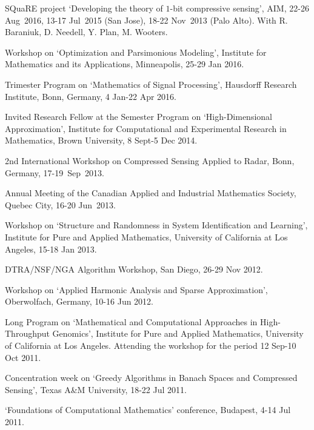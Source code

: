 \documentclass[11pt]{article}
\begin{document}
\item SQuaRE project `Developing the theory of $1$-bit compressive sensing',
AIM, 22-26 Aug~2016, 13-17 Jul~2015 (San Jose), 18-22 Nov~2013 (Palo Alto). With R. Baraniuk, D. Needell, Y. Plan, M. Wooters.
\item Workshop on `Optimization and Parsimonious Modeling', 
Institute for Mathematics and its Applications, Minneapolis, 25-29 Jan 2016.
\item Trimester Program on `Mathematics of Signal Processing', Hausdorff Research Institute, Bonn, Germany,
4 Jan-22 Apr 2016.
\item Invited Research Fellow at the Semester Program on `High-Dimensional Approximation', 
Institute for Computational and Experimental Research in Mathematics, Brown University,
8 Sept-5 Dec 2014.
\item 2nd International Workshop on Compressed Sensing Applied to Radar,
Bonn, Germany, 17-19~Sep~2013.
\item Annual Meeting of the Canadian Applied
and Industrial Mathematics Society, Quebec City, 16-20 Jun~2013. 
\item Workshop on `Structure and Randomness in System Identification and Learning',
Institute for Pure and Applied Mathematics, University of California at Los Angeles, 15-18 Jan 2013.
\item DTRA/NSF/NGA Algorithm Workshop, San Diego, 26-29 Nov 2012.
\item Workshop on `Applied Harmonic Analysis and Sparse Approximation', Oberwolfach, Germany, 10-16 Jun 2012.
\item Long Program on `Mathematical and Computational Approaches in High-Throughput Genomics', 
Institute for Pure and Applied Mathematics, University of California at Los Angeles.
Attending the workshop for the period 12 Sep-10 Oct 2011.
\item Concentration week on `Greedy Algorithms in Banach Spaces and Compressed Sensing', Texas A\&M University, 18-22 Jul 2011.
\item `Foundations of Computational Mathematics' conference, Budapest, 4-14 Jul 2011.
\end{document}
